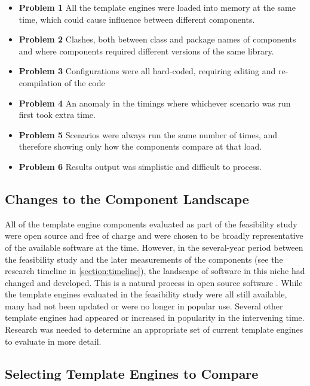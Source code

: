 \begin{itemize}
    \item \textbf{Problem 1} All the \gls{template engine}s were loaded into memory at the same time, which could cause influence between different components.
    \item \textbf{Problem 2} Clashes, both between class and package names of components and where components required different versions of the same library.
    \item \textbf{Problem 3} Configurations were all hard-coded, requiring editing and re-compilation of the code   \item \textbf{Problem 4} An anomaly in the timings where whichever scenario was run first took extra time.
    \item \textbf{Problem 5} Scenarios were always run the same number of times, and therefore showing only how the components compare at that load.
    \item \textbf{Problem 6} Results output was simplistic and difficult to process.
\end{itemize}

\subsection{Changes to the Component Landscape}
\label{section:comp:changes}

All of the \gls{template engine} components evaluated as part of the feasibility study were open source and free of charge and were chosen to be broadly representative of the available software at the time. However, in the several-year period between the feasibility study and the later measurements of the components (see the research timeline in \autoref{section:timeline}), the landscape of software in this niche had changed and developed. This is a natural process in open source software \citep{Sonatype2023} \citep{Xie2009}. While the \gls{template engine}s evaluated in the feasibility study were all still available, many had not been updated or were no longer in popular use. Several other \gls{template engine}s had appeared or increased in popularity in the intervening time. Research was needed to determine an appropriate set of current \gls{template engine}s to evaluate in more detail.

\subsection{Selecting Template Engines to Compare}
\label{section:comp:selecting}


